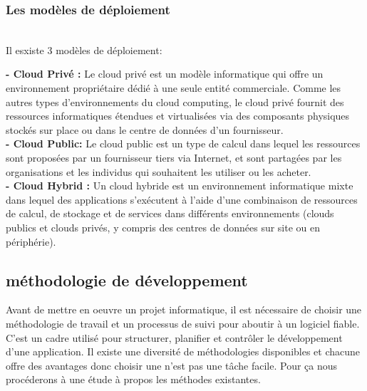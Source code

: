\subsubsection{\Large Les modèles de déploiement }
\texttt{}\\[0.1cm]
\textsf{\selectfont{}Il esxiste 3 modèles de déploiement:}
\texttt{}\\[0.1cm]
\par \noindent \textbf{\LARGE - Cloud Privé :  }\textsf{\selectfont{} Le cloud privé est un modèle informatique qui offre un environnement propriétaire dédié à une seule entité commerciale. Comme les autres types d'environnements du cloud computing, le cloud privé fournit des ressources informatiques étendues et virtualisées via des composants physiques stockés sur place ou dans le centre de données d'un fournisseur.\cite{6}}\\[0.1cm]

\noindent \textbf{\LARGE - Cloud Public: }\textsf{\selectfont{} Le cloud public est un type de calcul dans lequel les ressources sont proposées par un fournisseur tiers via Internet, et sont partagées par les organisations et les individus qui souhaitent les utiliser ou les acheter.\cite{7}}\\[0.1cm]

\noindent \textbf{\LARGE - Cloud Hybrid :  }\textsf{\selectfont{} Un cloud hybride est un environnement informatique mixte dans lequel des applications s'exécutent à l'aide d'une combinaison de ressources de calcul, de stockage et de services dans différents environnements (clouds publics et clouds privés, y compris des centres de données sur site ou en périphérie).\cite{8}}\\[0.1cm]

\subsection {\Large méthodologie de développement }
\textsf{\selectfont{}
Avant de mettre en oeuvre un projet informatique, il est nécessaire de choisir une méthodologie de travail et un processus de suivi pour aboutir à un logiciel fiable.
C’est un cadre utilisé pour structurer, planifier et contrôler le développement d’une application.
Il existe une diversité de méthodologies disponibles et
chacune offre des avantages donc choisir une n’est pas une tâche facile.
Pour ça nous procéderons à une étude à propos les méthodes existantes.}\\[0.2cm]
